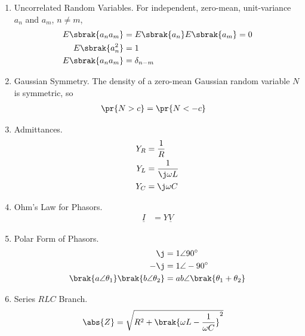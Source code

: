 \begin{enumerate}[label=\thesubsection.\arabic*, ref=\thesubsection.\theenumi]
\begin{align}
p_{X+Y}\sbrak{k} &= \sum_{i} p_X\sbrak{i}\, p_Y\sbrak{k - i}
\label{eq:F-conv-pmf}
\end{align}
\solution The event $\cbrak{X + Y = k}$ is the union over $i$ of the disjoint events $\cbrak{X = i, Y = k - i}$. Hence
\begin{align}
\pr{X + Y = k} &= \sum_{i} \pr{X = i, Y = k - i}
\\
&= \sum_{i} \pr{X = i}\pr{Y = k - i}
\\
&= \sum_{i} p_X\sbrak{i}\, p_Y\sbrak{k - i}
\end{align}
upon using \eqref{eq:F-indep}.
\item Uncorrelated Random Variables. For independent, zero-mean, unit-variance $a_n$ and $a_m$, $n \ne m$,
\begin{align}
E\sbrak{a_n a_m} &= E\sbrak{a_n}E\sbrak{a_m} = 0
\\
E\sbrak{a_n^2} &= 1
\\
E\sbrak{a_n a_m} &= \delta_{n - m}
\label{eq:F-uncorr}
\end{align}
\item Gaussian Symmetry. The density of a zero-mean Gaussian random variable $N$ is symmetric, so
\begin{align}
\pr{N > c} &= \pr{N < -c}
\label{eq:F-gauss-sym}
\end{align}
\item Admittances.
\begin{align}
Y_R &= \frac{1}{R}
\\
Y_L &= \frac{1}{\j \omega L}
\\
Y_C &= \j \omega C
\label{eq:F-admittance}
\end{align}
\item Ohm's Law for Phasors.
\begin{align}
\underline{I} &= Y \underline{V}
\label{eq:F-phasor-ohm}
\end{align}
\item Polar Form of Phasors.
\begin{align}
\j &= 1 \angle 90^\circ
\\
-\j &= 1 \angle -90^\circ
\\
\brak{a \angle \theta_1}\brak{b \angle \theta_2} &= ab \angle \brak{\theta_1 + \theta_2}
\label{eq:F-polar}
\end{align}
\item Series $RLC$ Branch.
\begin{align}
\abs{Z} &= \sqrt{R^2 + \brak{\omega L - \frac{1}{\omega C}}^2}
\label{eq:F-series-rlc}

\end{align}
\end{enumerate}
